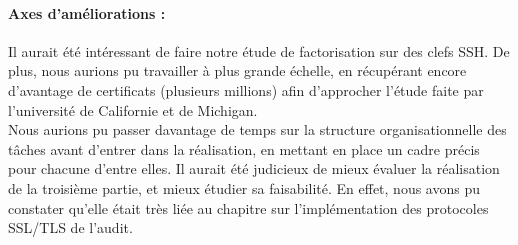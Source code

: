 \paragraph{Axes d'améliorations :\\}
Il aurait été intéressant de faire notre étude de factorisation sur des clefs SSH. De plus, nous aurions pu travailler à plus grande échelle, en récupérant encore d'avantage de certificats (plusieurs millions) afin d'approcher l'étude faite par l'université de Californie et de Michigan.\\

Nous aurions pu passer davantage de temps sur la structure organisationnelle des tâches avant d'entrer dans la réalisation, en mettant en place un cadre précis pour chacune d'entre elles. Il aurait été judicieux de mieux évaluer la réalisation de la troisième partie, et mieux étudier sa faisabilité. En effet, nous avons pu constater qu'elle était très liée au chapitre sur l'implémentation des protocoles SSL/TLS de l'audit.\\

